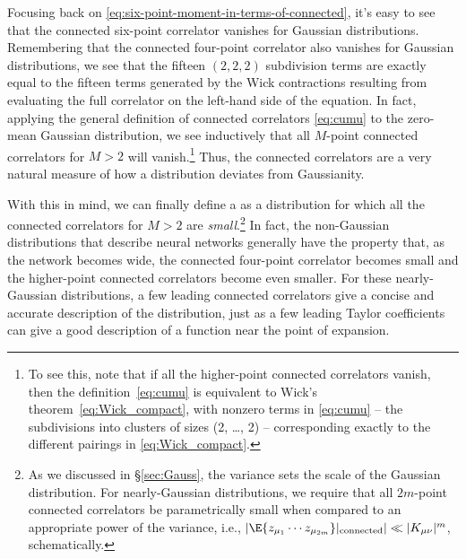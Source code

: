 Focusing back on \eqref{eq:six-point-moment-in-terms-of-connected}, it's easy to see that the connected six-point correlator vanishes for Gaussian distributions.
Remembering that the connected four-point correlator also vanishes for Gaussian distributions, we see that the fifteen $(2,2,2)$ subdivision terms are exactly equal to the fifteen terms generated by the Wick contractions resulting from evaluating the full correlator on the left-hand side of the equation. In fact, applying the general definition of connected correlators \eqref{eq:cumu} to the zero-mean Gaussian distribution, we see inductively that all $M$-point connected correlators for $M > 2$ will vanish.\footnote{To see this, 
note that if all the higher-point connected correlators vanish, then the definition~\eqref{eq:cumu} is equivalent to Wick's theorem~\eqref{eq:Wick_compact}, with nonzero terms in \eqref{eq:cumu} -- the subdivisions into clusters of sizes (2, \dots, 2) --  corresponding exactly to the different pairings in \eqref{eq:Wick_compact}.} %
Thus, the connected correlators are a very natural measure of how a distribution deviates from  Gaussianity.


With this in mind, we can finally define a  as a distribution for which all the connected correlators for $M>2$ are \emph{small}.\footnote{
As we discussed in \S\ref{sec:Gauss}, the variance sets the scale of the Gaussian distribution. For nearly-Gaussian distributions, we require that all $2m$-point connected correlators be parametrically small when compared to an appropriate power of the variance, i.e., $\vert \E{z_{\mu_1} \cdots z_{\mu_{2m}}}|_{\text{connected}}\vert \ll \vert K_{\mu\nu}\vert^m$, schematically.}
In fact, the non-Gaussian distributions that describe neural networks generally have the 
property that, as the network becomes wide, the connected four-point correlator becomes small and the
higher-point connected correlators become even smaller.
For these nearly-Gaussian distributions, a few leading connected correlators give a concise and accurate description of the distribution, just as a few leading Taylor coefficients can give a good description of a function near the point of expansion.







































